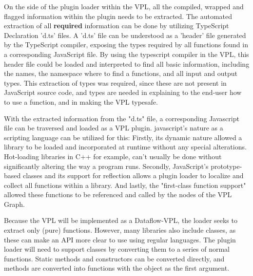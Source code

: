 


On the side of the plugin loader within the VPL, all the compiled, wrapped and flagged information within the plugin needs to be extracted. 
The automated extraction of all \textbf{required} information can be done by utilizing TypeScript Declaration 'd.ts' files. 
A 'd.ts' file can be understood as a 'header' file generated by the TypeScript compiler, exposing the types required by all functions found in a corresponding JavaScript file.
By using the typescript compiler in the VPL, this header file could be loaded and interpreted to find all basic information, including the names, the namespace where to find a functions, and all input and output types.
This extraction of types was required, since these are not present in JavaScript source code, and types are needed in explaining to the end-user how to use a function, and in making the VPL typesafe.

With the extracted information from the "d.ts" file, a corresponding Javascript file can be traversed and loaded as a VPL plugin. 
javascript's nature as a scripting language can be utilized for this:
Firstly, its dynamic nature allowed a library to be loaded and incorporated at runtime without any special alterations. 
Hot-loading libraries in C++ for example, can't usually be done without significantly altering the way a program runs. 
Secondly, JavaScript's prototype-based classes and its support for reflection allows a plugin loader to localize and collect all functions within a library.
And lastly, the "first-class function support" allowed these functions to be referenced and called by the nodes of the VPL Graph. 

Because the VPL will be implemented as a Dataflow-VPL, the loader seeks to extract only (pure) functions. 
However, many libraries also include classes, as these can make an API more clear to use using regular languages. 
The plugin loader will need to support classes by converting them to a series of normal functions. 
Static methods and constructors can be converted directly, and methods are converted into functions with the object as the first argument.

